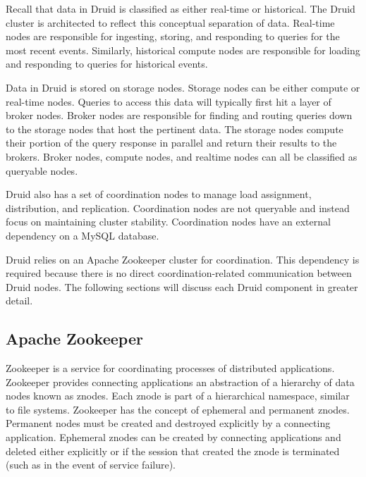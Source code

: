 \documentclass{vldb}
\begin{document}
Recall that data in Druid is classified as either real-time or
historical. The Druid cluster is architected to reflect this
conceptual separation of data. Real-time nodes are responsible for
ingesting, storing, and responding to queries for the most recent
events. Similarly, historical compute nodes are responsible for
loading and responding to queries for historical events.

Data in Druid is stored on storage nodes. Storage nodes can be either compute or real-time nodes. 
Queries to access this data will typically first hit a layer
of broker nodes. Broker nodes are responsible for finding and routing
queries down to the storage nodes that host the pertinent data. The
storage nodes compute their portion of the query response in parallel
and return their results to the brokers. Broker nodes, compute nodes, and realtime nodes can all be classified as queryable nodes.

Druid also has a set of coordination nodes to manage load assignment,
distribution, and replication. Coordination nodes are not queryable
and instead focus on maintaining cluster stability. Coordination nodes
have an external dependency on a MySQL database.

Druid relies on an Apache Zookeeper \cite{hunt2010zookeeper} cluster for
coordination. This dependency is required because there is no direct coordination-related communication between Druid nodes. The following sections will discuss each Druid component
in greater detail.

\subsection{Apache Zookeeper}
Zookeeper is a service for coordinating processes of distributed
applications. Zookeeper provides connecting applications an
abstraction of a hierarchy of data nodes known as znodes. Each znode
is part of a hierarchical namespace, similar to file
systems. Zookeeper has the concept of ephemeral and permanent
znodes. Permanent nodes must be created and destroyed explicitly by a
connecting application. Ephemeral znodes can be created by connecting
applications and deleted either explicitly or if the session that
created the znode is terminated (such as in the event of service
failure).
\end{document}
